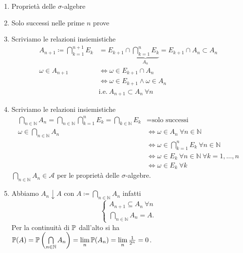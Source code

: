 \begin{enumerate}
	\item Proprietà delle $\sigma $-algebre
	\item Solo successi nelle prime $n$ prove
	\item Scriviamo le relazioni insiemistiche
	\begin{align*}
		A_{n+1} \coloneqq \bigcap\limits _{k=1}^{n+1} E_{k} & =E_{k+1} \cap \underbrace{\bigcap\limits _{k=1}^{n} E_{k}}_{A_{n}} =E_{k+1} \cap A_{n} \subset A_{n}\\
		\omega \in A_{n+1} & \iff \omega \in E_{k+1} \cap A_{n}\\
		 & \iff \omega \in E_{k+1} \land \omega \in A_{n}\\
		 & \text{i.e.} \ A_{n+1} \subset A_{n} \ \forall n
	\end{align*}
	\item Scriviamo le relazioni insiemistiche
	\begin{align*}
		\bigcap\limits _{n\in \mathbb{N}} A_{n} =\bigcap\limits _{n\in \mathbb{N}}\bigcap\limits _{k=1}^{n} E_{k} =\bigcap\limits _{k\in \mathbb{N}} E_{k} & =\text{solo successi}\\
		\omega \in \bigcap\limits _{n\in \mathbb{N}} A_{n} & \iff \omega \in A_{n} \ \forall n\in \mathbb{N}\\
		 & \iff \omega \in \bigcap\limits _{k=1}^{n} E_{k} \ \forall n\in \mathbb{N}\\
		 & \iff \omega \in E_{k} \ \forall n\in \mathbb{N} \ \forall k=1,\dots ,n\\
		 & \iff \omega \in E_{k} \ \forall k
	\end{align*}
	$\bigcap\limits _{n\in \mathbb{N}} A_{n} \in \mathcal{A}$ per le proprietà delle $\sigma $-algebre.
	\item Abbiamo $A_{n} \downarrow A$ con $A\coloneqq \bigcap\limits _{n\in \mathbb{N}} A_{n}$ infatti
	\[
		\begin{cases}
			A_{n+1} \subseteq A_{n} \ \forall n\\
			\bigcap_{n\in \mathbb{N}} A_{n} =A.
		\end{cases}
	\]
	Per la continuità di $\mathbb{P}$ dall'alto si ha $\mathbb{P}( A) =\mathbb{P}\left(\bigcap\limits _{n\in \mathbb{N}} A_{n}\right) =\lim\limits _{n}\mathbb{P}( A_{n}) =\lim\limits _{n}\frac{1}{2^{n}} =0$.
\end{enumerate}

\Soluzione

